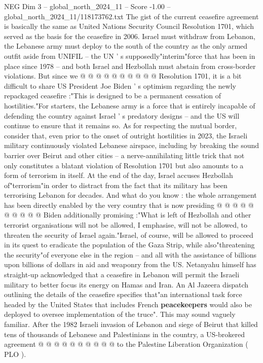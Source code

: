 \begin{textsample}{NEG Dim 3 – global\_north\_2024\_11 – Score -1.00 – global\_north\_2024\_11/118173762.txt}
The gist of the current ceasefire agreement is basically the same as United Nations Security Council Resolution 1701, which served as the basis for the ceasefire in 2006.
Israel must withdraw from Lebanon, the Lebanese army must deploy to the south of the country as the only armed outfit aside from UNIFIL -- the UN ' s supposedly"interim"force that has been in place since 1978 -- and both Israel and Hezbollah must abstain from cross-border violations.
But since we @ @ @ @ @ @ @ @ @ @ Resolution 1701, it is a bit difficult to share US President Joe Biden ' s optimism regarding the newly repackaged ceasefire :"This is designed to be a permanent cessation of hostilities."For starters, the Lebanese army is a force that is entirely incapable of defending the country against Israel ' s predatory designs -- and the US will continue to ensure that it remains so.
As for respecting the mutual border, consider that, even prior to the onset of outright hostilities in 2023, the Israeli military continuously violated Lebanese airspace, including by breaking the sound barrier over Beirut and other cities -- a nerve-annihilating little trick that not only constitutes a blatant violation of Resolution 1701 but also amounts to a form of terrorism in itself.
At the end of the day, Israel accuses Hezbollah of"terrorism"in order to distract from the fact that its military has been terrorising Lebanon for decades.
And what do you know : the whole arrangement has been directly enabled by the very country that is now presiding @ @ @ @ @ @ @ @ @ @ Biden additionally promising :"What is left of Hezbollah and other terrorist organisations will not be allowed, I emphasise, will not be allowed, to threaten the security of Israel again."Israel, of course, will be allowed to proceed in its quest to eradicate the population of the Gaza Strip, while also"threatening the security"of everyone else in the region -- and all with the assistance of billions upon billions of dollars in aid and weaponry from the US.
Netanyahu himself has straight-up acknowledged that a ceasefire in Lebanon will permit the Israeli military to better focus its energy on Hamas and Iran.
An Al Jazeera dispatch outlining the details of the ceasefire specifies that"an international task force headed by the United States that includes French \textbf{peacekeepers} would also be deployed to oversee implementation of the truce".
This may sound vaguely familiar.
After the 1982 Israeli invasion of Lebanon and siege of Beirut that killed tens of thousands of Lebanese and Palestinians in the country, a US-brokered agreement @ @ @ @ @ @ @ @ @ @ to the Palestine Liberation Organization ( PLO ).

\end{textsample}
